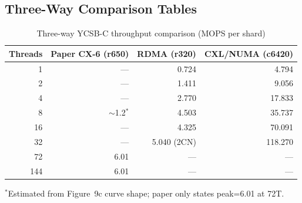 \documentclass[conference]{IEEEtran}
\begin{document}
\begin{table}[H]
\centering
\caption{CXL/NUMA: Facebook (FB) and OpenStreetMap (OSM) datasets (uniform, coro=2)}
\label{tab:numa-datasets}
\scriptsize
{}
\end{table}

\subsection*{Three-Way Comparison Tables}

\begin{table}[H]
\centering
\caption{Three-way YCSB-C throughput comparison (MOPS per shard)}
\label{tab:three-way}
\scriptsize
\begin{tabular}{@{}rrrr@{}}
\toprule
\textbf{Threads} & \textbf{Paper CX-6 (r650)} & \textbf{RDMA (r320)} & \textbf{CXL/NUMA (c6420)} \\
\midrule
1  & --- & 0.724 & 4.794 \\
2  & --- & 1.411 & 9.056 \\
4  & --- & 2.770 & 17.833 \\
8  & $\sim$1.2$^*$ & 4.503 & 35.737 \\
16 & --- & 4.325 & 70.091 \\
32 & --- & 5.040 (2CN) & 118.270 \\
72 & 6.01 & --- & --- \\
144 & 6.01 & --- & --- \\
\bottomrule
\end{tabular}

\vspace{2pt}
{\scriptsize $^*$Estimated from Figure~9c curve shape; paper only states peak=6.01 at 72T.}
\end{table}
\end{document}
